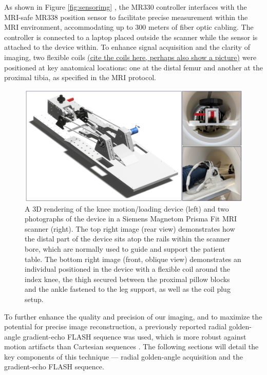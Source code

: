 \documentclass{micro-econ-thesis}
\begin{document}
As shown in Figure \ref{fig:sensorimg} , the MR330 controller interfaces with the MRI-safe MR338 position sensor to facilitate precise measurement within the MRI environment, accommodating up to 300 meters of fiber optic cabling. The controller is connected to a laptop placed outside the scanner while the sensor is attached to the device within. To enhance signal acquisition and the clarity of imaging, two flexible coils \underline{(cite the coils here, perhaps also show a picture)} were positioned at key anatomical locations: one at the distal femur and another at the proximal tibia, as specified in the MRI protocol.
\begin{figure}[H]
	\centering
	\includegraphics[width=0.9\linewidth]{knee_device}
	\caption{A 3D rendering of the knee motion/loading device (left) and two photographs of the device in a Siemens Magnetom Prisma Fit MRI scanner (right). The top right image (rear view) demonstrates how the distal part of the device sits atop the rails within the scanner bore, which are normally used to guide and support the patient table. The bottom right image (front, oblique view) demonstrates an individual positioned in the device with a flexible coil around the index knee, the thigh secured between the proximal pillow blocks and the ankle fastened to the leg support, as well as the coil plug setup.}
	\label{fig:kneedevice}
\end{figure}
 


  
To further enhance the quality and precision of our imaging, and to maximize the potential for precise image reconstruction, a previously reported radial golden-angle gradient-echo FLASH sequence was used, which is more robust against motion artifacts than Cartesian sequences \parencite{aleksiev_high-resolution_2022}. The following sections will detail the key components of this technique — radial golden-angle acquisition and the gradient-echo FLASH sequence.
\end{document}
